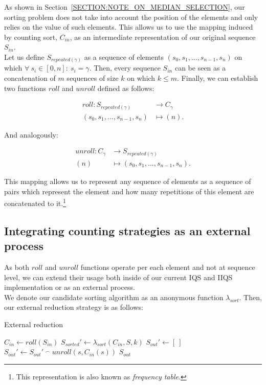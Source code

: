 As shown in Section~\ref{SECTION:NOTE_ON_MEDIAN_SELECTION}, our sorting problem does not take into account the position of the elements and only relies on the value of such elements. This allows us to use the mapping induced by counting sort, $C_{in}$, as an intermediate representation of our original sequence $S_{in}$.\\

Let us define $S_{repeated(\gamma)}$ as a sequence of elements $(s_0, s_1,...,s_{n-1},s_{n})$ on which $\forall ~s_i \in [0,n]:~s_i = \gamma$. Then, every sequence $S_{in}$ can be seen as a concatenation of $m$ sequences of size $k$ on which $k \leq m$. Finally, we can establish two functions $roll$ and $unroll$ defined as follows:

\begin{align*}
    roll \colon S_{repeated(\gamma)} &\to C_{\gamma}\\
    (s_0, s_1,...,s_{n-1},s_{n})  &\mapsto (n).
\end{align*}

And analogously:

\begin{align*}
    unroll \colon C_{\gamma} &\to S_{repeated(\gamma)}\\
    (n) &\mapsto (s_0, s_1,...,s_{n-1},s_{n}).
\end{align*}

This mapping allows us to represent any sequence of elements as a sequence of pairs which represent the element and how many repetitions of this element are concatenated to it.\footnote{This representation is also known as \emph{frequency table}.}\\

\subsection{Integrating counting strategies as an external process}
As both $roll$ and $unroll$ functions operate per each element and not at sequence level, we can extend their usage both inside of our current IQS and IIQS implementation or as an external process.\\

We denote our candidate sorting algorithm as an anonymous function $\lambda_{sort}$. Then, our external reduction strategy is as follows:


\begin{algorithm}
\caption{External reduction}\label{ALG:EXTERNAL_IQS}
\begin{algorithmic}[1]
    \State $C_{in} \gets roll(S_{in})$
    \State $S_{sorted}' \gets \lambda_{sort}(C_{in}, S, k)$
    \State $S_{out}' \gets [~]$
        \State $S_{out}' \gets S_{out}'~^\frown~unroll(s, C_{in}(s))$
    \EndFor
    \State \Return $S_{out}$
    \EndProcedure
\end{algorithmic}
\end{algorithm}

